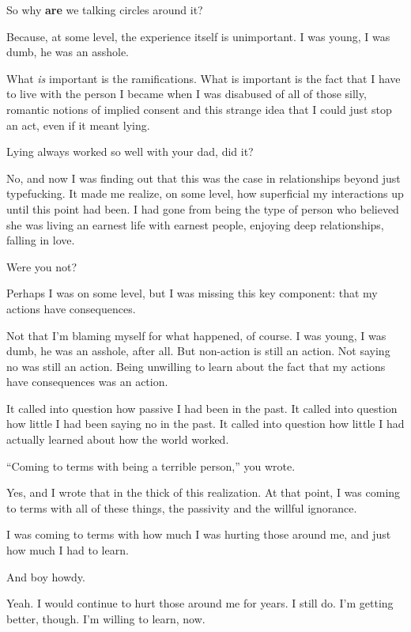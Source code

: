 \begin{ally}
So why \textbf{are} we talking circles around it?
\end{ally}
Because, at some level, the experience itself is unimportant. I was young, I was dumb, he was an asshole.

What \emph{is} important is the ramifications. What is important is the fact that I have to live with the person I became when I was disabused of all of those silly, romantic notions of implied consent and this strange idea that I could just stop an act, even if it meant lying.

\begin{ally}
Lying always worked so well with your dad, did it?
\end{ally}
No, and now I was finding out that this was the case in relationships beyond just typefucking. It made me realize, on some level, how superficial my interactions up until this point had been. I had gone from being the type of person who believed she was living an earnest life with earnest people, enjoying deep relationships, falling in love.

\begin{ally}
Were you not?
\end{ally}
Perhaps I was on some level, but I was missing this key component: that my actions have consequences.

Not that I'm blaming myself for what happened, of course. I was young, I was dumb, he was an asshole, after all. But non-action is still an action. Not saying no was still an action. Being unwilling to learn about the fact that my actions have consequences was an action.

It called into question how passive I had been in the past. It called into question how little I had been saying no in the past. It called into question how little I had actually learned about how the world worked.

\begin{ally}
``Coming to terms with being a terrible person,'' you wrote.
\end{ally}
Yes, and I wrote that in the thick of this realization. At that point, I was coming to terms with all of these things, the passivity and the willful ignorance.

I was coming to terms with how much I was hurting those around me, and just how much I had to learn.

\begin{ally}
And boy howdy.
\end{ally}
Yeah. I would continue to hurt those around me for years. I still do. I'm getting better, though. I'm willing to learn, now.

